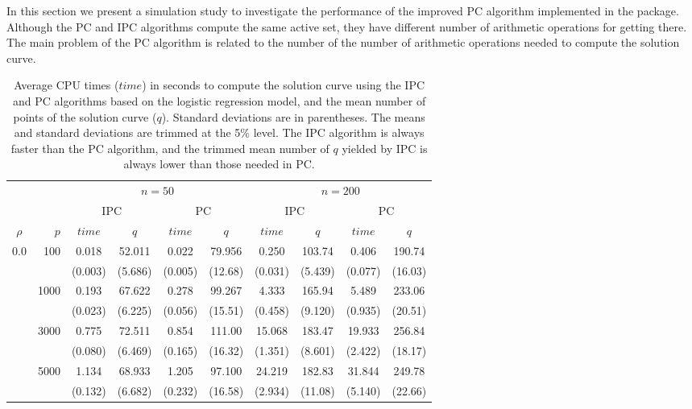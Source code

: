 In this section we present a simulation study to investigate the performance of the improved PC algorithm implemented in the  package. Although the PC and IPC algorithms compute the same active set, they have different number of arithmetic operations for getting there. The main problem of the PC algorithm is related to the number of the  number of arithmetic operations needed to compute the solution curve.

\begin{table}[t!]
	\centering
	\caption{Average CPU times ($time$) in seconds to compute the solution curve using the IPC and PC algorithms based on the logistic regression model, and the mean number of points of the solution curve ($q$). Standard deviations are in parentheses. The means and standard deviations are trimmed at the 5\% level. The IPC algorithm is always faster than the PC algorithm, and the trimmed mean number of $q$ yielded by IPC is always lower than those needed in PC. 
	\label{tab:cpu}}
	\begin{tabular}{crcccccccc}
		\hline
		& & \multicolumn{4}{c}{$n = 50$} & \multicolumn{4}{c}{$n = 200$}\\
		& & \multicolumn{2}{c}{IPC} &\multicolumn{2}{c}{PC} & \multicolumn{2}{c}{IPC} &\multicolumn{2}{c}{PC} \\
		$\rho$ & $p$ & $time$ & \multicolumn{1}{c}{$q$} & $time$ & \multicolumn{1}{c}{$q$} & $time$ & \multicolumn{1}{c}{$q$} & $time$ & \multicolumn{1}{c}{$q$}\\
		\hline
		\multirow{10}{*}{0.0}
		& 100   & 0.018  & 52.011  &  0.022 & 79.956 &  0.250 & 103.74 &  0.406 & 190.74 \\ 
		&          &  (0.003) & (5.686) & (0.005) & (12.68) & (0.031) & (5.439) & (0.077) & (16.03) \\
		\cline{3-10}
		& 1000   &  0.193 & 67.622 &  0.278 & 99.267  & 4.333 & 165.94 &  5.489 & 233.06 \\ 
		&          &  (0.023) & (6.225) & (0.056) & (15.51) & (0.458) & (9.120) & (0.935) & (20.51)\\
		\cline{3-10}
		& 3000   & 	0.775 & 72.511 &  0.854 & 111.00 & 15.068 & 183.47 & 19.933 & 256.84 \\ 
		&          & (0.080) & (6.469) & (0.165) & (16.32) & (1.351) & (8.601) & (2.422) & (18.17) \\
		\cline{3-10}
		& 5000   &  1.134 & 68.933  & 1.205 & 97.100 & 24.219 & 182.83 &  31.844 & 249.78 \\ 
		&          & (0.132) & (6.682) & (0.232) & (16.58) & (2.934) & (11.08) & (5.140) & (22.66)\\

\end{tabular}
\end{table}
